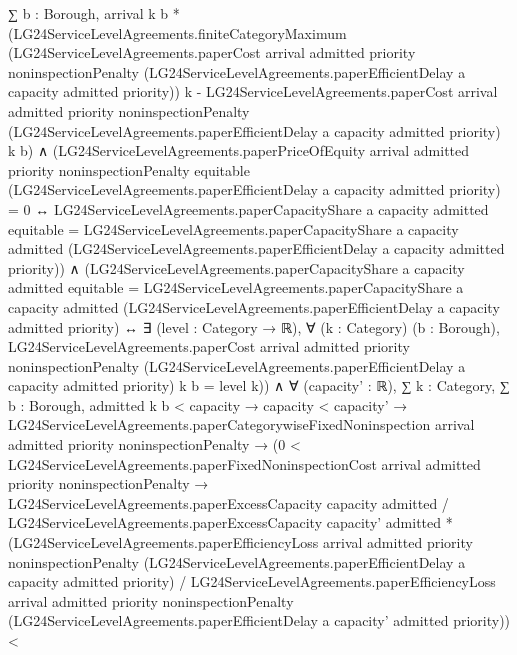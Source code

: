 \documentclass[10pt]{article}
\begin{document}
\begin{ReviewVerbatim}
                ∑ b : Borough,
                  arrival k b *
                    (LG24ServiceLevelAgreements.finiteCategoryMaximum
                        (LG24ServiceLevelAgreements.paperCost arrival admitted priority noninspectionPenalty
                          (LG24ServiceLevelAgreements.paperEfficientDelay a capacity admitted priority))
                        k -
                      LG24ServiceLevelAgreements.paperCost arrival admitted priority noninspectionPenalty
                        (LG24ServiceLevelAgreements.paperEfficientDelay a capacity admitted priority) k b) ∧
          (LG24ServiceLevelAgreements.paperPriceOfEquity arrival admitted priority noninspectionPenalty equitable
                  (LG24ServiceLevelAgreements.paperEfficientDelay a capacity admitted priority) =
                0 ↔
              LG24ServiceLevelAgreements.paperCapacityShare a capacity admitted equitable =
                LG24ServiceLevelAgreements.paperCapacityShare a capacity admitted
                  (LG24ServiceLevelAgreements.paperEfficientDelay a capacity admitted priority)) ∧
            (LG24ServiceLevelAgreements.paperCapacityShare a capacity admitted equitable =
                LG24ServiceLevelAgreements.paperCapacityShare a capacity admitted
                  (LG24ServiceLevelAgreements.paperEfficientDelay a capacity admitted priority) ↔
              ∃ (level : Category → ℝ),
                ∀ (k : Category) (b : Borough),
                  LG24ServiceLevelAgreements.paperCost arrival admitted priority noninspectionPenalty
                      (LG24ServiceLevelAgreements.paperEfficientDelay a capacity admitted priority) k b =
                    level k)) ∧
  ∀ (capacity' : ℝ),
    ∑ k : Category, ∑ b : Borough, admitted k b < capacity →
      capacity < capacity' →
        LG24ServiceLevelAgreements.paperCategorywiseFixedNoninspection arrival admitted priority noninspectionPenalty →
          (0 < LG24ServiceLevelAgreements.paperFixedNoninspectionCost arrival admitted priority noninspectionPenalty →
              LG24ServiceLevelAgreements.paperExcessCapacity capacity admitted /
                    LG24ServiceLevelAgreements.paperExcessCapacity capacity' admitted *
                  (LG24ServiceLevelAgreements.paperEfficiencyLoss arrival admitted priority noninspectionPenalty
                      (LG24ServiceLevelAgreements.paperEfficientDelay a capacity admitted priority) /
                    LG24ServiceLevelAgreements.paperEfficiencyLoss arrival admitted priority noninspectionPenalty
                      (LG24ServiceLevelAgreements.paperEfficientDelay a capacity' admitted priority)) <

\end{ReviewVerbatim}
\end{document}

